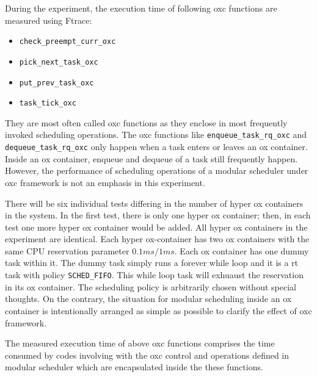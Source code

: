 During the experiment, the execution time of following oxc functions are 
measured using Ftrace:
\begin{itemize} 
\item \texttt{check\_preempt\_curr\_oxc}
\item \texttt{pick\_next\_task\_oxc}
\item \texttt{put\_prev\_task\_oxc}
\item \texttt{task\_tick\_oxc}
\end{itemize} 
They are most often called oxc functions as they enclose in most frequently
invoked scheduling operations. The oxc functions like 
\texttt{enqueue\_task\_rq\_oxc} and \texttt{dequeue\_task\_rq\_oxc} only 
happen when a task enters or leaves an ox container. Inside an
ox container, enqueue and dequeue of a task still frequently happen.
However, the performance of scheduling operations of a modular
scheduler under oxc framework is not an emphasis in this experiment.

There will be six individual tests differing in the number of hyper ox 
containers in the system. In the first test, there is only one hyper 
ox container; then, in each test one more hyper ox container would be 
added. All hyper ox containers in the experiment are identical.
Each hyper ox-container has two ox containers with the same CPU 
reservation parameter $0.1ms/1ms$. Each ox container has one dummy task 
within it. The dummy task simply runs a forever while loop and it is a 
rt task with policy \texttt{SCHED\_FIFO}. This while loop task will 
exhuaust the reservation in its ox container. The scheduling policy is 
arbitrarily chosen without special thoughts. On the contrary, the 
situation for modular scheduling inside an ox container is intentionally
arranged as simple as possible to clarify the effect of oxc framework.

The measured execution time of above oxc functions comprises the time 
consumed by codes involving with the oxc control and operations defined 
in modular scheduler which are encapsulated inside the these functions.


